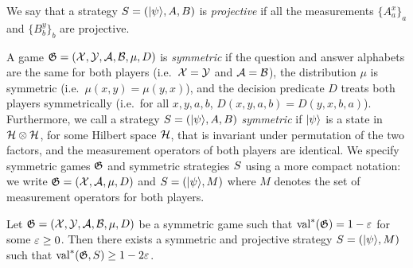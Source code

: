 \begin{definition}
  \label{definition-projective-strategy}
  We say that a strategy $\strategy = (\ket{\psi}, A, B)$ is \emph{projective} if
  all the measurements $\{A^x_a\}_a$ and $\{B^y_b\}_b$ are projective.
\end{definition}

\begin{remark}
  \label{remark-symmetric-games}
	A game $\game = (\cal{X}, \cal{Y}, \cal{A}, \cal{B}, \mu, D)$ is
  \emph{symmetric} if the question and answer alphabets are the same for both
  players (i.e.\
  $\cal{X} = \cal{Y}$ and $\cal{A} = \cal{B}$), the distribution $\mu$ is
  symmetric (i.e.\
  $\mu(x,y) = \mu(y,x)$), and the decision predicate $D$ treats both players
  symmetrically (i.e.\ for all $x,y,a,b$, $D(x,y,a,b) = D(y,x,b,a)$).
  Furthermore, we call a strategy $\strategy = (\ket{\psi}, A, B)$
  \emph{symmetric} if $\ket{\psi}$ is a state in $\mH \otimes \mH$, for some
  Hilbert space $\mH$, that is invariant under permutation of the two factors,
  and the measurement operators of both players are identical.
  We specify symmetric games $\game$ and symmetric strategies $\strategy$ using
  a more compact notation: we write $\game = (\cal{X}, \cal{A}, \mu, D)$ and
  $\strategy = (\ket{\psi}, M)$ where $M$ denotes the set of measurement
  operators for both players.
\end{remark}

\begin{lemma}
  \label{lemma-symmetric-strat}
  Let $\game = (\cal{X}, \cal{Y}, \cal{A}, \cal{B}, \mu, D)$ be a symmetric game
  such that $\val^*(\game) = 1-\eps$ for some $\eps\geq 0$.
  Then there exists a symmetric and projective strategy
  $\strategy=(\ket{\psi},M)$ such that $\val^*(\game,\strategy)\geq 1-2\eps$.
\end{lemma}

